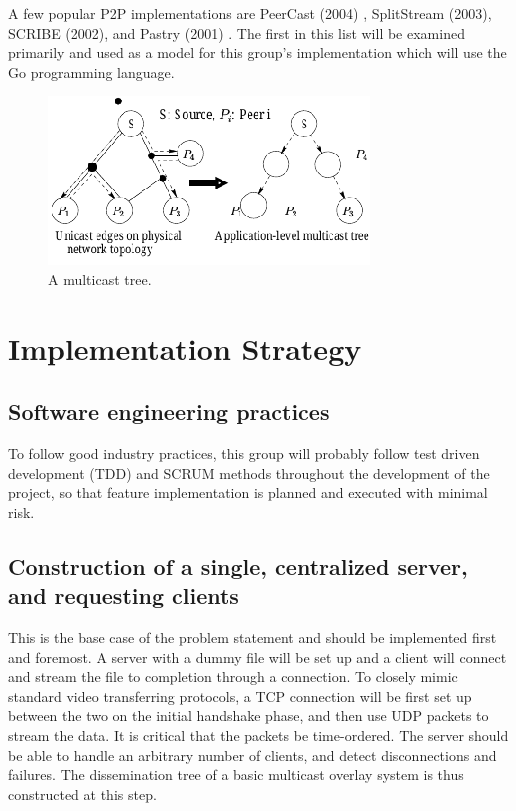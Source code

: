 \documentclass[fleqn,24pt]{SelfArx} %
\begin{document}
A few popular P2P implementations are PeerCast (2004) \cite{1}, SplitStream (2003), SCRIBE (2002), and Pastry (2001) \cite{3}. The first in this list will be examined primarily and used as a model for this group's implementation which will use the Go programming language. 

\begin{figure}[!htb]
\includegraphics{Selection_148.png}
\caption{\label{family}A multicast tree.}
\label{1}
\end{figure}

\section{Implementation Strategy}

\subsection{Software engineering practices}
To follow good industry practices, this group will probably follow test driven development (TDD) and SCRUM methods throughout the development of the project, so that feature implementation is planned and executed with minimal risk. 

\subsection{Construction of a single, centralized server, and requesting clients}
This is the base case of the problem statement and should be implemented first and foremost. A server with a dummy file will be set up and a client will connect and stream the file to completion through a connection. To closely mimic standard video transferring protocols, a TCP connection will be first set up between the two on the initial handshake phase, and then use UDP packets to stream the data. It is critical that the packets be time-ordered. The server should be able to handle an arbitrary number of clients, and detect disconnections and failures. The dissemination tree of a basic multicast overlay system is thus constructed at this step.
\end{document}
